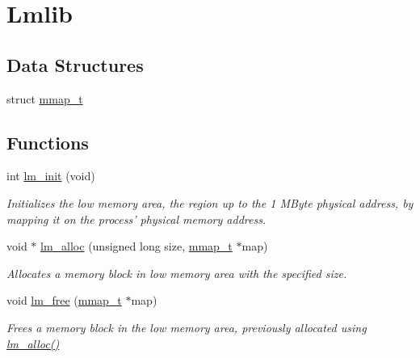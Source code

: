 \hypertarget{group___lmlib}{\section{Lmlib}
\label{group___lmlib}
}
\subsection*{Data Structures}
\begin{DoxyCompactItemize}
\item 
struct \hyperlink{structmmap__t}{mmap\-\_\-t}
\end{DoxyCompactItemize}
\subsection*{Functions}
\begin{DoxyCompactItemize}
\item 
int \hyperlink{group___lmlib_gae63b76326b99915fefac9a34ca382d8b}{lm\-\_\-init} (void)
\begin{DoxyCompactList}\small\item\em Initializes the low memory area, the region up to the 1 M\-Byte physical address, by mapping it on the process' physical memory address. \end{DoxyCompactList}\item 
void $\ast$ \hyperlink{group___lmlib_gae45d971ce2ffcf4dc2677eba033a92cd}{lm\-\_\-alloc} (unsigned long size, \hyperlink{structmmap__t}{mmap\-\_\-t} $\ast$map)
\begin{DoxyCompactList}\small\item\em Allocates a memory block in low memory area with the specified size. \end{DoxyCompactList}\item 
void \hyperlink{group___lmlib_ga73e89d9c297b7390021fb545513579c6}{lm\-\_\-free} (\hyperlink{structmmap__t}{mmap\-\_\-t} $\ast$map)
\begin{DoxyCompactList}\small\item\em Frees a memory block in the low memory area, previously allocated using \hyperlink{group___lmlib_gae45d971ce2ffcf4dc2677eba033a92cd}{lm\-\_\-alloc()} \end{DoxyCompactList}\end{DoxyCompactItemize}
